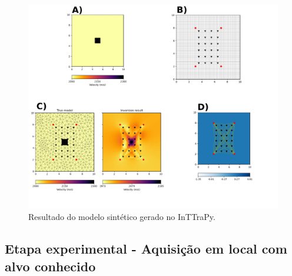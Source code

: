 \documentclass[a4paper, 12 pt]{article} %
\begin{document}
\begin{description}
\begin{table}[!hbtp]
\begin{tabular}{@{}ll@{}}
			\\ \bottomrule
		\end{tabular}
	\end{table}
	
	\begin{figure}[!hbtp]
		\begin{center}
			\includegraphics[scale=0.408]{Figuras/exemplo.png}
		\end{center}
		\caption{Resultado do modelo sintético gerado no InTTraPy.}
		\label{dado_sintetico}
	\end{figure} \newpage
	
\end{description}


\subsection{Etapa experimental - Aquisição em local com alvo conhecido}

\blindtext 
%
\blindtext 
%
\blindtext

\end{document}
